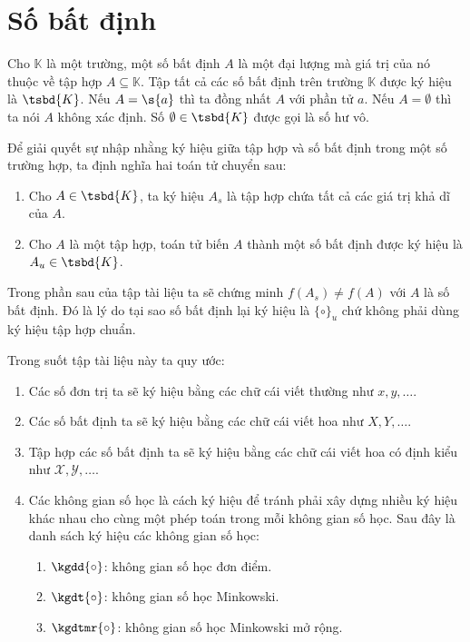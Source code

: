 \section{Số bất định}
\begin{definition}
	Cho $\mathbb{K}$ là một trường, một số bất định $A$ là một đại lượng mà giá trị của nó thuộc về tập hợp $A \subseteq \mathbb{K}$. Tập tất cả các số bất định trên trường $\mathbb{K}$ được ký hiệu là $\tsbd{K}$. Nếu $A =\s{a}$ thì ta đồng nhất $A$ với phần tử $a$. Nếu $ A =\emptyset $ thì ta nói $A$ không xác định. Số $\emptyset \in \tsbd{K}$ được gọi là số hư vô.
\end{definition}
\begin{definition}
	Để giải quyết sự nhập nhằng ký hiệu giữa tập hợp và số bất định trong một số trường hợp, ta định nghĩa hai toán tử chuyển sau:
	\begin{enumerate}
		\item Cho $A \in \tsbd{K}$, ta ký hiệu $A_s$ là tập hợp chứa tất cả các giá trị khả dĩ của $A$.
		\item Cho $A$ là một tập hợp, toán tử biến $A$ thành một số bất định được ký hiệu là $A_u \in \tsbd{K}$.
	\end{enumerate}
\end{definition}
\begin{remark}
	Trong phần sau của tập tài liệu ta sẽ chứng minh $f(A_s) \neq f(A)$ với $A$ là số bất định. Đó là lý do tại sao số bất định lại ký hiệu là $\{\circ\}_u$ chứ không phải dùng ký hiệu tập hợp chuẩn.
\end{remark}
\begin{remark}
	Trong suốt tập tài liệu này ta quy ước:
	\begin{enumerate}[leftmargin=*]
		\item Các số đơn trị ta sẽ ký hiệu bằng các chữ cái viết thường như $x, y, \dots$.
		\item Các số bất định ta sẽ ký hiệu bằng các chữ cái viết hoa như $X, Y, \dots$.
		\item Tập hợp các số bất định ta sẽ ký hiệu bằng các chữ cái viết hoa có định kiểu như $\mathcal{X}, \mathcal{Y}, \dots$.
		\item Các không gian số học là cách ký hiệu để tránh phải xây dựng nhiều ký hiệu khác nhau cho cùng một phép toán trong mỗi không gian số học. Sau đây là danh sách ký hiệu các không gian số học:
		\begin{enumerate}
			\item $\kgdd{\circ}$: không gian số học đơn điểm.
			\item $\kgdt{\circ}$: không gian số học Minkowski.
			\item $\kgdtmr{\circ}$: không gian số học Minkowski mở rộng.
		\end{enumerate}
	\end{enumerate}
\end{remark}
